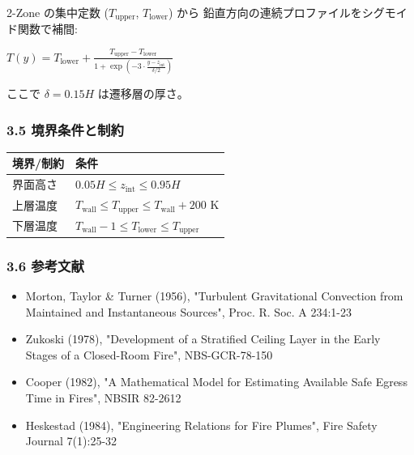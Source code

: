 \documentclass[a4paper,11pt]{article}
\begin{document}
2-Zone の集中定数 ($T_{\text{upper}}$, $T_{\text{lower}}$) から
鉛直方向の連続プロファイルをシグモイド関数で補間:

$
T(y) = T_{\text{lower}} + \frac{T_{\text{upper}} - T_{\text{lower}}}{1 + \exp\left(-3 \cdot \frac{y - z_{\text{int}}}{\delta / 2}\right)}
$

ここで $\delta = 0.15 H$ は遷移層の厚さ。

\subsubsection{3.5 境界条件と制約}

{\small
\noindent
\begin{tabularx}{\textwidth}{|L|L|}
\hline
\textbf{境界/制約} & \textbf{条件} \\
\hline
界面高さ & $0.05 H \le z_{\text{int}} \le 0.95 H$ \\
\hline
上層温度 & $T_{\text{wall}} \le T_{\text{upper}} \le T_{\text{wall}} + 200$ K \\
\hline
下層温度 & $T_{\text{wall}} - 1 \le T_{\text{lower}} \le T_{\text{upper}}$ \\
\hline
\end{tabularx}
}


\subsubsection{3.6 参考文献}

\begin{itemize} \item Morton, Taylor \& Turner (1956), "Turbulent Gravitational Convection from Maintained and Instantaneous Sources", Proc. R. Soc. A 234:1-23 \end{itemize}
\begin{itemize} \item Zukoski (1978), "Development of a Stratified Ceiling Layer in the Early Stages of a Closed-Room Fire", NBS-GCR-78-150 \end{itemize}
\begin{itemize} \item Cooper (1982), "A Mathematical Model for Estimating Available Safe Egress Time in Fires", NBSIR 82-2612 \end{itemize}
\begin{itemize} \item Heskestad (1984), "Engineering Relations for Fire Plumes", Fire Safety Journal 7(1):25-32 \end{itemize}
\end{document}
